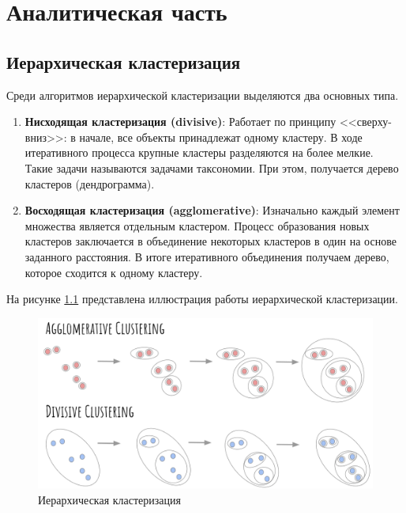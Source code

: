 \chapter{Аналитическая часть}

\section{Иерархическая кластеризация}

Среди алгоритмов иерархической кластеризации выделяются два основных типа.
\begin{enumerate}[label*=\arabic*.]
	\item \textbf{Нисходящая кластеризация (divisive)}: Работает
	по принципу <<сверху-вниз>>: в начале, все объекты
	принадлежат одному кластеру. В ходе
	итеративного процесса крупные кластеры
	разделяются на более мелкие. Такие задачи
	называются задачами таксономии. При этом,
	получается дерево кластеров (дендрограмма).
	\item  \textbf{Восходящая кластеризация (agglomerative)}:
	Изначально каждый элемент множества является
	отдельным кластером. Процесс образования
	новых кластеров заключается в объединение
	некоторых кластеров в один на основе заданного
	расстояния. В итоге итеративного объединения
	получаем дерево, которое сходится к одному
	кластеру.
\end{enumerate}

На рисунке \ref{img:algo} представлена иллюстрация работы иерархической кластеризации.
\begin{figure}
	\begin{center}
		\includegraphics[width=\textwidth]{images/algo.png}
	\end{center}
	\caption{Иерархическая кластеризация}
	\label{img:algo}
\end{figure}

\FloatBarrier



